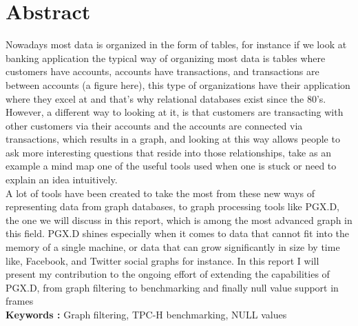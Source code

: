 \chapter*{Abstract}
Nowadays most data is organized in the form of tables, for instance if we look at banking application the typical way of organizing most data is tables where customers have accounts, accounts have transactions, and transactions are between accounts (a figure here), this type of organizations have their application where they excel at and that’s why relational databases exist since the 80’s. However, a different way to looking at it, is that customers are transacting with other customers via their accounts and the accounts are connected via transactions, which results in a graph, and looking at this way allows people to ask more interesting questions that reside into those relationships, take as an example a mind map one of the useful tools used when one is stuck or need to explain an idea intuitively. 
\\
A lot of tools have been created to take the most from these new ways of representing data from graph databases, to graph processing tools like PGX.D, the one we will discuss in this report, which is among the most advanced graph in this field. PGX.D shines especially when it comes to data that cannot fit into the memory of a single machine, or data that can grow significantly in size by time like, Facebook, and Twitter social graphs for instance. In this report I will present my contribution to the ongoing effort of extending the capabilities of PGX.D, from graph filtering to benchmarking and finally null value support in frames
\\
\noindent\textbf{Keywords :} Graph filtering, TPC-H benchmarking, NULL values

\newpage




